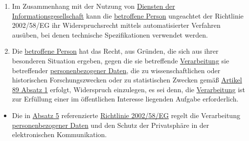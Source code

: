 \begin{enumerate}
  \item Im Zusammenhang mit der Nutzung von \hyperref[itm:04-28]{Diensten der Informationsgesellschaft} kann die \hyperref[itm:04-1]{betroffene Person} ungeachtet
   der Richtlinie 2002/58/EG ihr Widerspruchsrecht mittels automatisierter Verfahren ausüben, bei denen technische
   Spezifikationen verwendet werden.
  \label{itm:21-5}

  \item Die \hyperref[itm:04-1]{betroffene Person} hat das Recht, aus Gründen, die sich aus ihrer besonderen Situation ergeben, gegen die sie
   betreffende \hyperref[itm:04-2]{Verarbeitung} sie betreffender \hyperref[itm:04-1]{personenbezogener Daten}, die zu wissenschaftlichen oder historischen
   Forschungszwecken oder zu statistischen Zwecken gemäß \hyperref[itm:89-1]{Artikel 89 Absatz 1} erfolgt, Widerspruch
   einzulegen, es sei denn, die \hyperref[itm:04-2]{Verarbeitung} ist zur Erfüllung einer im öffentlichen Interesse liegenden Aufgabe
   erforderlich.
  \label{itm:21-6}

\end{enumerate}


\begin{itemize}

  \item Die in \hyperref[itm:21-5]{Absatz 5} referenzierte
   \href{https://eur-lex.europa.eu/legal-content/DE/TXT/HTML/?uri=CELEX:32002L0058&qid=1659212895940&from=DE}
    {Richtlinie 2002/58/EG} regelt die Verarbeitung \hyperref[itm:04-1]{personenbezogener Daten} und den Schutz der Privatsphäre in der
    elektronischen Kommunikation.

\end{itemize}





